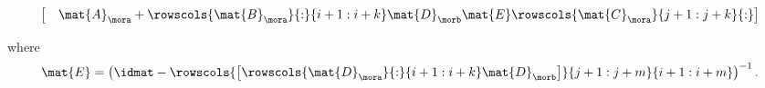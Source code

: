 {\begin{example}
\begin{widepar}
\begin{equation*}
\begin{aligned}
\begin{bmatrix}
                                        & \mat{A}_\mora +\rowscols{\mat{B}_\mora}{:}{i+1:i+k}\mat{D}_\morb \mat{E}\rowscols{\mat{C}_\mora}{j+1:j+k}{:}
                                   \end{bmatrix}
                \end{aligned}
            \end{equation*}
        \end{widepar}
        where
        \begin{equation*}
            \mat{E}=\left(\idmat - \rowscols{\begin{bmatrix}
                    \rowscols{\mat{D}_\mora}{:}{i+1:i+k}\mat{D}_\morb
                \end{bmatrix}}{j+1:j+m}{i+1:i+m}\right)^{-1}.
        \end{equation*}


\end{example}}
